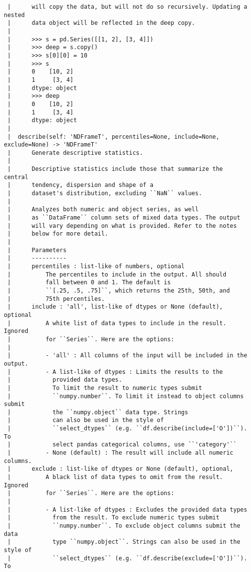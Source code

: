 \documentclass[
  letterpaper,
  DIV=11,
  numbers=noendperiod]{scrreprt}
\begin{document}
\begin{verbatim}
 |      will copy the data, but will not do so recursively. Updating a nested
 |      data object will be reflected in the deep copy.
 |      
 |      >>> s = pd.Series([[1, 2], [3, 4]])
 |      >>> deep = s.copy()
 |      >>> s[0][0] = 10
 |      >>> s
 |      0    [10, 2]
 |      1     [3, 4]
 |      dtype: object
 |      >>> deep
 |      0    [10, 2]
 |      1     [3, 4]
 |      dtype: object
 |  
 |  describe(self: 'NDFrameT', percentiles=None, include=None, exclude=None) -> 'NDFrameT'
 |      Generate descriptive statistics.
 |      
 |      Descriptive statistics include those that summarize the central
 |      tendency, dispersion and shape of a
 |      dataset's distribution, excluding ``NaN`` values.
 |      
 |      Analyzes both numeric and object series, as well
 |      as ``DataFrame`` column sets of mixed data types. The output
 |      will vary depending on what is provided. Refer to the notes
 |      below for more detail.
 |      
 |      Parameters
 |      ----------
 |      percentiles : list-like of numbers, optional
 |          The percentiles to include in the output. All should
 |          fall between 0 and 1. The default is
 |          ``[.25, .5, .75]``, which returns the 25th, 50th, and
 |          75th percentiles.
 |      include : 'all', list-like of dtypes or None (default), optional
 |          A white list of data types to include in the result. Ignored
 |          for ``Series``. Here are the options:
 |      
 |          - 'all' : All columns of the input will be included in the output.
 |          - A list-like of dtypes : Limits the results to the
 |            provided data types.
 |            To limit the result to numeric types submit
 |            ``numpy.number``. To limit it instead to object columns submit
 |            the ``numpy.object`` data type. Strings
 |            can also be used in the style of
 |            ``select_dtypes`` (e.g. ``df.describe(include=['O'])``). To
 |            select pandas categorical columns, use ``'category'``
 |          - None (default) : The result will include all numeric columns.
 |      exclude : list-like of dtypes or None (default), optional,
 |          A black list of data types to omit from the result. Ignored
 |          for ``Series``. Here are the options:
 |      
 |          - A list-like of dtypes : Excludes the provided data types
 |            from the result. To exclude numeric types submit
 |            ``numpy.number``. To exclude object columns submit the data
 |            type ``numpy.object``. Strings can also be used in the style of
 |            ``select_dtypes`` (e.g. ``df.describe(exclude=['O'])``). To

\end{verbatim}
\end{document}
